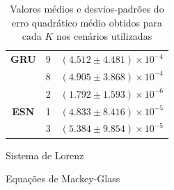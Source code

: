 \documentclass[a4paper, 12pt]{article}
\begin{document}
\begin{table}[!ht]
\begin{center}
\begin{subtable}{0.35\textwidth}
\begin{center}
{\begin{tabular}{c c c}
 \addlinespace
 {\centering \textbf{GRU}} & 9 & $(4.512 \pm 4.481) \times 10^{-4}$\\ 
 \addlinespace
 & 8 & $(4.905 \pm 3.868) \times 10^{-4}$\\
 \addlinespace
 \hline
 \addlinespace
 & 2 & $(1.792 \pm 1.593) \times 10^{-6}$\\
 \addlinespace
 {\centering \textbf{ESN}} & 1 & $(4.833 \pm 8.416) \times 10^{-5}$\\ 
 \addlinespace 
 & 3 & $(5.384 \pm 9.854) \times 10^{-5}$\\
 \bottomrule
\end{tabular}}
\caption{Sistema de Lorenz}
\label{tab:lorenz-eqm-3best}
\end{center}
\end{subtable}
\begin{subtable}{0.35\textwidth}
\begin{center}
\caption{Equações de Mackey-Glass}
\label{tab:mackeyglass-eqm-3best}
\end{center}
\end{subtable}
\caption{Valores médios e desvios-padrões do erro quadrático médio obtidos para cada $K$ nos cenários utilizadas}
\label{tab:eqm-results-3best}
\end{center}
\end{table}
\end{document}
